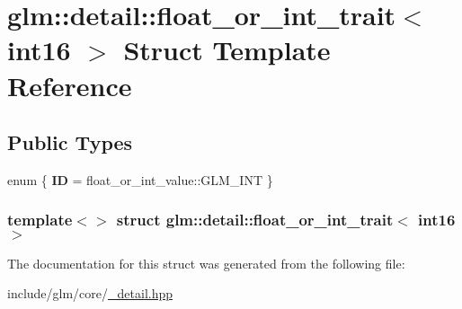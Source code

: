 \hypertarget{structglm_1_1detail_1_1float__or__int__trait_3_01int16_01_4}{\section{glm\-:\-:detail\-:\-:float\-\_\-or\-\_\-int\-\_\-trait$<$ int16 $>$ \-Struct \-Template \-Reference}
\label{structglm_1_1detail_1_1float__or__int__trait_3_01int16_01_4}
}
\subsection*{\-Public \-Types}
\begin{DoxyCompactItemize}
\item 
enum \{ {\bfseries \-I\-D} =  float\-\_\-or\-\_\-int\-\_\-value\-:\-:\-G\-L\-M\-\_\-\-I\-N\-T
 \}
\end{DoxyCompactItemize}
\subsubsection*{template$<$$>$ struct glm\-::detail\-::float\-\_\-or\-\_\-int\-\_\-trait$<$ int16 $>$}



\-The documentation for this struct was generated from the following file\-:\begin{DoxyCompactItemize}
\item 
include/glm/core/\hyperlink{__detail_8hpp}{\-\_\-detail.\-hpp}\end{DoxyCompactItemize}
